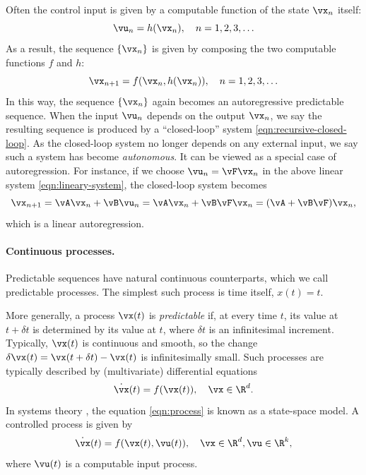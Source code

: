 \documentclass[../../book-main.tex]{subfiles}
\begin{document}
Often the control input is given by a computable function of the
state \(\vx_{n}\) itself:
\begin{equation}
    \vu_{n} = h(\vx_{n}), \quad n = 1, 2, 3, \ldots
    \label{eqn:control-function}
\end{equation}
As a result, the sequence \(\{\vx_{n}\}\) is given by composing the
two computable functions \(f\) and \(h\):
\begin{equation}
    \vx_{n+1} = f(\vx_{n}, h(\vx_{n})), \quad n = 1, 2, 3, \ldots
    \label{eqn:recursive-closed-loop}
\end{equation}
In this way, the sequence \(\{\vx_{n}\}\) again becomes an
autoregressive predictable sequence. When the input \(\vu_{n}\)
depends on the output \(\vx_{n}\), we say the resulting sequence is
produced by a ``closed-loop'' system
\eqref{eqn:recursive-closed-loop}. As the closed-loop system no
longer depends on any external input, we say such a system has become
\textit{autonomous}. It can be viewed as a special case of
autoregression. For instance, if we choose \(\vu_{n} = \vF\vx_{n}\)
in the above linear system \eqref{eqn:lineary-system}, the
closed-loop system becomes
\begin{equation}
    \vx_{n+1} = \vA\vx_{n} + \vB\vu_{n} = \vA\vx_{n} + \vB\vF\vx_{n}
    = (\vA + \vB\vF)\vx_{n},
    \label{eqn:lineary-system-closed}
\end{equation}
which is a linear autoregression.

\paragraph{Continuous processes.}
Predictable sequences have natural continuous counterparts, which we
call predictable processes. The simplest such process is time itself,
\(x(t) = t\).

More generally, a process \(\vx(t)\) is \textit{predictable} if, at
every time \(t\), its value at \(t + \delta t\) is determined by its
value at \(t\), where \(\delta t\) is an infinitesimal increment.
Typically, \(\vx(t)\) is continuous and smooth, so the change
\(\delta \vx(t) = \vx(t + \delta t) - \vx(t)\) is infinitesimally
small. Such processes are typically described by (multivariate)
differential equations
\begin{equation}
    \dot{\vx}(t) = f(\vx(t)), \quad \vx \in \R^{d}.
    \label{eqn:process}
\end{equation}
In systems theory \cite{Cal:Des,Sastry-Nonlinear}, the equation
\eqref{eqn:process} is known as a state-space model. A controlled
process is given by
\begin{equation}
    \dot{\vx}(t) = f(\vx(t), \vu(t)), \quad \vx \in \R^{d}, \vu \in \R^{k},
    \label{eqn:process-controlled}
\end{equation}
where \(\vu(t)\) is a computable input process.
\end{document}
